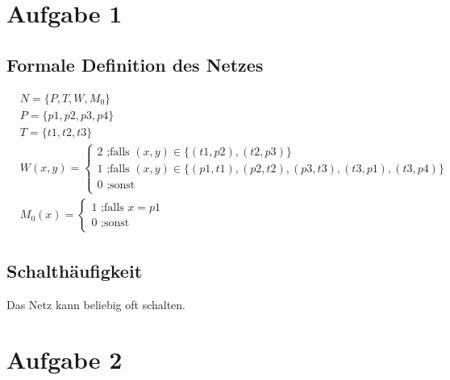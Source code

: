 \documentclass[10pt]{scrartcl}
\author{André Harms, Oliver Steenbuck}
\title{\titletext}
\date{19.04.2012}
\begin{document}
\maketitle

\setcounter{tocdepth}{3}
\tableofcontents

	\listoffigures  

\section{Aufgabe 1}
	\subsection{Formale Definition des Netzes}
	\begin{align}
	&N =\{P,T,W,M_0\}\\
	&P =\{p1,p2,p3,p4\}\\
	&T =\{t1,t2,t3\}\\
	&W(x,y) =\begin{cases}
			2 \text{ ;falls } (x,y) \in \{(t1,p2),(t2,p3)\} \\
			1 \text{ ;falls } (x,y) \in \{(p1,t1),(p2,t2), (p3,t3), (t3,p1), (t3,p4)\} \\
			0 \text{ ;sonst}
	     \end{cases}\\
	&M_0(x)=  \begin{cases}
			1 \text{ ;falls } x=p1\\
			0 \text{ ;sonst}
	     \end{cases}   
	\end{align}	

	\subsection{Schalthäufigkeit}
	Das Netz kann beliebig oft schalten.

\section{Aufgabe 2}
\end{document}
